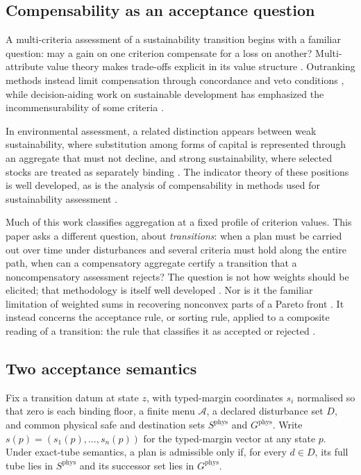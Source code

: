 \documentclass[preprint,11pt,authoryear]{elsarticle}
\theoremstyle{definition}
\theoremstyle{remark}
\begin{document}
\subsection{Compensability as an acceptance question}

A multi-criteria assessment of a sustainability transition begins with a familiar question: may a gain on one criterion compensate for a loss on another? Multi-attribute value theory makes trade-offs explicit in its value structure \citep{KeeneyRaiffa1976}. Outranking methods instead limit compensation through concordance and veto conditions \citep{Roy1996,Vincke1992}, while decision-aiding work on sustainable development has emphasized the incommensurability of some criteria \citep{Munda2005,MartinezAlier1998}.

In environmental assessment, a related distinction appears between weak sustainability, where substitution among forms of capital is represented through an aggregate that must not decline, and strong sustainability, where selected stocks are treated as separately binding \citep{WorldBank2011,Neumayer2013,Boos2015,Daly1990,Ekins2003}. The indicator theory of these positions is well developed, as is the analysis of compensability in methods used for sustainability assessment \citep{Hanley1999,Martinet2011,CairnsMartinet2014,DoyenGajardo2020,Usubiaga2025,Cinelli2014,Schar2025}.

Much of this work classifies aggregation at a fixed profile of criterion values. This paper asks a different question, about \emph{transitions}: when a plan must be carried out over time under disturbances and several criteria must hold along the entire path, when can a compensatory aggregate certify a transition that a noncompensatory assessment rejects? The question is not how weights should be elicited; that methodology is itself well developed \citep{Nardo2008,Becker2017}. Nor is it the familiar limitation of weighted sums in recovering nonconvex parts of a Pareto front \citep{DasDennis1997}. It instead concerns the acceptance rule, or sorting rule, applied to a composite reading of a transition: the rule that classifies it as accepted or rejected \citep{Roy1996}.

\subsection{Two acceptance semantics}

Fix a transition datum at state $z$, with typed-margin coordinates $s_i$ normalised so that zero is each binding floor, a finite menu $\mathcal A$, a declared disturbance set $D$, and common physical safe and destination sets $S^{\mathrm{phys}}$ and $G^{\mathrm{phys}}$. Write $s(p)=(s_1(p),\dots,s_n(p))$ for the typed-margin vector at any state $p$. Under exact-tube semantics, a plan is admissible only if, for every $d\in D$, its full tube lies in $S^{\mathrm{phys}}$ and its successor set lies in $G^{\mathrm{phys}}$.
\end{document}
